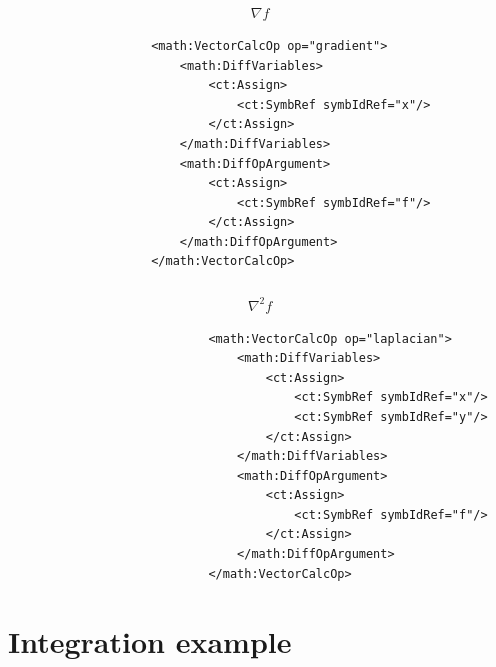 \subsubsection*{}

\begin{align}
 \nabla f  \nonumber 
\end{align}

\lstset{language=XML}
\begin{lstlisting}
                    <math:VectorCalcOp op="gradient">
                        <math:DiffVariables>
                            <ct:Assign>
                                <ct:SymbRef symbIdRef="x"/>
                            </ct:Assign>
                        </math:DiffVariables>
                        <math:DiffOpArgument>
                            <ct:Assign>
                                <ct:SymbRef symbIdRef="f"/>
                            </ct:Assign>
                        </math:DiffOpArgument>
                    </math:VectorCalcOp>
\end{lstlisting}


\subsubsection*{}

\begin{align}
 \nabla^2 f  \nonumber 
\end{align}


\lstset{language=XML}
\begin{lstlisting}
                            <math:VectorCalcOp op="laplacian">
                                <math:DiffVariables>
                                    <ct:Assign>
                                        <ct:SymbRef symbIdRef="x"/>
                                        <ct:SymbRef symbIdRef="y"/>
                                    </ct:Assign>
                                </math:DiffVariables>
                                <math:DiffOpArgument>
                                    <ct:Assign>
                                        <ct:SymbRef symbIdRef="f"/>
                                    </ct:Assign>
                                </math:DiffOpArgument>
                            </math:VectorCalcOp>
\end{lstlisting}



\section{Integration example}
\label{sec:integral}

